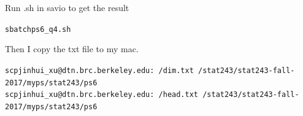 \documentclass{article}\usepackage[]{graphicx}\usepackage[]{color}
\makeatletter
\newenvironment{kframe}{%
 \def\at@end@of@kframe{}%
 \ifinner\ifhmode%
  \def\at@end@of@kframe{\end{minipage}}%
  \begin{minipage}{\columnwidth}%
 \fi\fi%
 \def\FrameCommand##1{\hskip\@totalleftmargin \hskip-\fboxsep
 \colorbox{shadecolor}{##1}\hskip-\fboxsep
     \hskip-\linewidth \hskip-\@totalleftmargin \hskip\columnwidth}%
 \MakeFramed {\advance\hsize-\width
   \@totalleftmargin\z@ \linewidth\hsize
   \@setminipage}}%
 {\par\unskip\endMakeFramed%
 \at@end@of@kframe}
\newenvironment{knitrout}{}{} %
\makeatother
\begin{document}
Run .sh in savio to get the result
\begin{knitrout}
\color{fgcolor}\begin{kframe}
\begin{alltt}
sbatch ps6_q4.sh
\end{alltt}
\end{kframe}
\end{knitrout}

Then I copy the txt file to my mac.
\begin{knitrout}
\color{fgcolor}\begin{kframe}
\begin{alltt}
scp jinhui_xu@dtn.brc.berkeley.edu:~/dim.txt ~/stat243/stat243-fall-2017/myps/stat243/ps6
scp jinhui_xu@dtn.brc.berkeley.edu:~/head.txt ~/stat243/stat243-fall-2017/myps/stat243/ps6
\end{alltt}
\end{kframe}
\end{knitrout}
\end{document}
